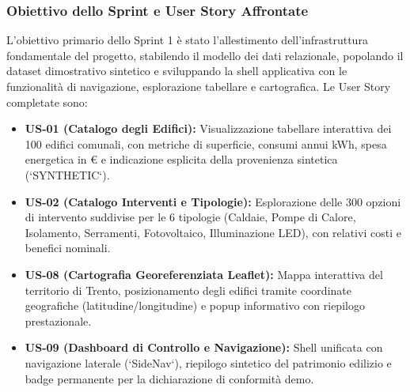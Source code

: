 \subsubsection{Obiettivo dello Sprint e User Story Affrontate}
L'obiettivo primario dello Sprint 1 è stato l'allestimento dell'infrastruttura fondamentale del progetto, stabilendo il modello dei dati relazionale, popolando il dataset dimostrativo sintetico e sviluppando la shell applicativa con le funzionalità di navigazione, esplorazione tabellare e cartografica.
Le User Story completate sono:
\begin{itemize}[leftmargin=1.5em, itemsep=0.2em]
    \item \textbf{US-01 (Catalogo degli Edifici):} Visualizzazione tabellare interattiva dei 100 edifici comunali, con metriche di superficie, consumi annui kWh, spesa energetica in \euro{} e indicazione esplicita della provenienza sintetica (`SYNTHETIC`).
    \item \textbf{US-02 (Catalogo Interventi e Tipologie):} Esplorazione delle 300 opzioni di intervento suddivise per le 6 tipologie (Caldaie, Pompe di Calore, Isolamento, Serramenti, Fotovoltaico, Illuminazione LED), con relativi costi e benefici nominali.
    \item \textbf{US-08 (Cartografia Georeferenziata Leaflet):} Mappa interattiva del territorio di Trento, posizionamento degli edifici tramite coordinate geografiche (latitudine/longitudine) e popup informativo con riepilogo prestazionale.
    \item \textbf{US-09 (Dashboard di Controllo e Navigazione):} Shell unificata con navigazione laterale (`SideNav`), riepilogo sintetico del patrimonio edilizio e badge permanente per la dichiarazione di conformità demo.
\end{itemize}


